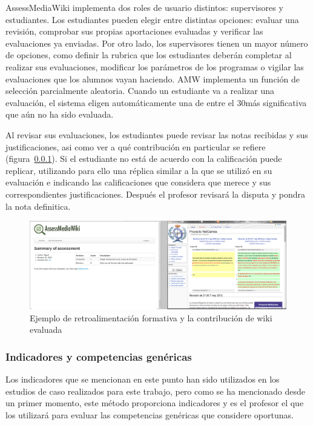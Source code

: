 AssessMediaWiki implementa dos roles de usuario distintos: supervisores y estudiantes. Los estudiantes pueden elegir entre distintas opciones: evaluar una revisión, comprobar sus propias aportaciones evaluadas y verificar las evaluaciones ya enviadas. Por otro lado, los supervisores tienen un mayor número de opciones, como definir la rubrica que los estudiantes deberán completar al realizar sus evaluaciones, modificar los parámetros de los programas o vigilar las evaluaciones que los alumnos vayan haciendo. AMW implementa un función de selección parcialmente aleatoria. Cuando un estudiante va a realizar una evaluación, el sistema eligen automáticamente una de entre el 30\percentage más significativa que aún no ha sido evaluada.

Al revisar sus evaluaciones, los estudiantes puede revisar las notas recibidas y sus justificaciones, asi como ver a qué contribución en particular se refiere (figura~\ref{}). Si el estudiante no está de acuerdo con la calificación puede replicar, utilizando para ello una réplica similar a la que se utilizó en su evaluación e indicando las calificaciones que considera que merece y sus correspondientes justificaciones. Después el profesor revisará la disputa y pondra la nota definitica.

\begin{figure}
  \begin{center}
    \includegraphics[scale=0.19]{AmwFormative.png}
  \end{center}
  \caption{Ejemplo de retroalimentación formativa y la contribución de wiki evaluada}
  \label{fig:AmwFormative}
\end{figure}



\subsubsection{Indicadores y competencias genéricas}

Los indicadores que se mencionan en este punto han sido utilizados en los estudios de caso realizados para este trabajo, pero como se ha mencionado desde un primer momento, este método proporciona indicadores y es el profesor el que los utilizará para evaluar las competencias genéricas que considere oportunas.

